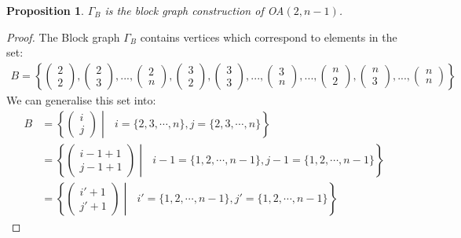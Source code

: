 \documentclass{article}
\newtheorem{proposition}{Proposition}
\begin{document}
\begin{proposition}
    \(\Gamma_B\) is the block graph construction of OA\((2,n-1)\).
\end{proposition}
\begin{proof} The Block graph \(\Gamma_B\) contains vertices which correspond to elements in the set:
\begin{align*}
    B = \left\{ \begin{pmatrix} 2 \\ 2 \end{pmatrix}, \begin{pmatrix} 2 \\ 3 \end{pmatrix},...,\begin{pmatrix} 2 \\ n \end{pmatrix},\begin{pmatrix} 3 \\ 2 \end{pmatrix}, \begin{pmatrix} 3 \\ 3 \end{pmatrix},...,\begin{pmatrix} 3 \\ n \end{pmatrix},...,\begin{pmatrix} n \\ 2 \end{pmatrix}, \begin{pmatrix} n \\ 3 \end{pmatrix},...,\begin{pmatrix} n \\ n \end{pmatrix} \right \}
\end{align*}
We can generalise this set into:
\begin{align*}
    B &= \left \{ \begin{pmatrix} i \\ j \end{pmatrix} \middle | \text{ } i = \{2,3,\cdots,n\}, j = \{2,3,\cdots,n\}\right \} \\
    & = \left \{ \begin{pmatrix} i-1 + 1 \\ j-1 + 1 \end{pmatrix} \middle | \text{ } i-1 = \{1,2,\cdots,n-1\}, j-1 = \{1,2,\cdots,n-1\}\right \} \\
    &= \left \{ \begin{pmatrix} i'+1 \\ j'+1 \end{pmatrix} \middle | \text{ } i' = \{1,2,\cdots,n-1\}, j' = \{1,2,\cdots,n-1\}\right \}

\end{align*}
\end{proof}
\end{document}
